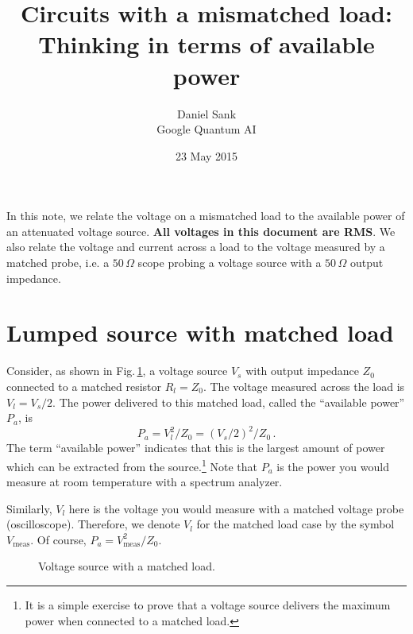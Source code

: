 \documentclass[twocolumn]{article}
\title{Circuits with a mismatched load:\\
Thinking in terms of available power}
\author{Daniel Sank \\
\small Google Quantum AI}
\date{23 May 2015}
\begin{document}
\maketitle

In this note, we relate the voltage on a mismatched load to the available power of an attenuated voltage source.
\textbf{All voltages in this document are RMS}.
We also relate the voltage and current across a load to the voltage measured by a matched probe, i.e. a $50\,\Omega$ scope probing a voltage source with a $50\,\Omega$ output impedance.

\section{Lumped source with matched load}

Consider, as shown in Fig.\,\ref{fig:lumped_matched_load}, a voltage source $V_s$ with output impedance $Z_0$ connected to a matched resistor $R_l=Z_0$.
The voltage measured across the load is $V_l = V_s/2$.
The power delivered to this matched load, called the ``available power'' $P_a$, is
\begin{equation}
P_a = V_l^2 / Z_0 = (V_s/2)^2 / Z_0 \, .
\end{equation}
The term ``available power'' indicates that this is the largest amount of power which can be extracted from the source.\footnote{It is a simple exercise to prove that a voltage source delivers the maximum power when connected to a matched load.}
Note that $P_a$ is the power you would measure at room temperature with a spectrum analyzer.

Similarly, $V_l$ here is the voltage you would measure with a matched voltage probe (oscilloscope).
Therefore, we denote $V_l$ for the matched load case by the symbol $V_{\text{meas}}$.
Of course, $P_a = V_{\text{meas}}^2 / Z_0$.

\begin{figure}
\begin{centering}
\par\end{centering}
\caption{Voltage source with a matched load.}
\label{fig:lumped_matched_load}
\end{figure}
\end{document}
